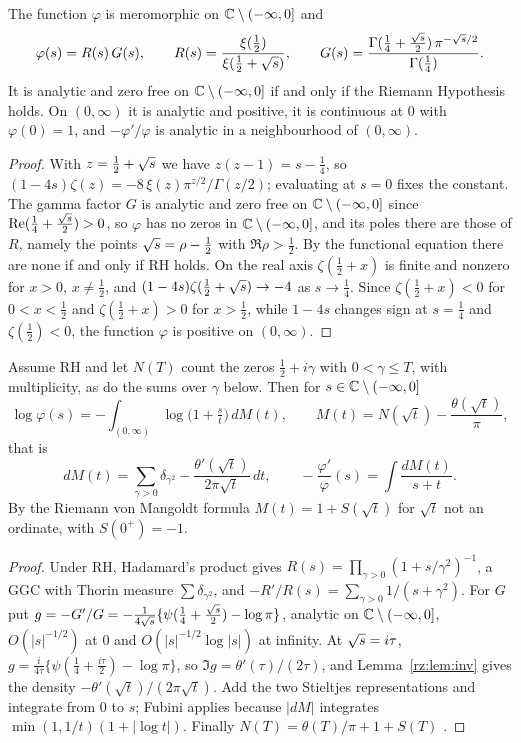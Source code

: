 \begin{proposition}\label{rz:prop:rh}
The function $\varphi$ is meromorphic on $\mathbb{C}\setminus(-\infty,0]$ and
\[
\varphi(s)=R(s)\,G(s),\qquad R(s)=\frac{\xi(\frac12)}{\xi(\frac12+\sqrt{s})},\qquad G(s)=\frac{\Gamma(\frac14+\frac{\sqrt{s}}2)\,\pi^{-\sqrt{s}/2}}{\Gamma(\frac14)} .
\]
It is analytic and zero free on $\mathbb{C}\setminus(-\infty,0]$ if and only if the Riemann Hypothesis holds. On $(0,\infty)$ it is analytic and positive, it is continuous at $0$ with $\varphi(0)=1$, and $-\varphi'/\varphi$ is analytic in a neighbourhood of $(0,\infty)$.
\end{proposition}

\begin{proof}
With $z=\frac12+\sqrt{s}$ we have $z(z-1)=s-\frac14$, so $(1-4s)\zeta(z)=-8\,\xi(z)\pi^{z/2}/\Gamma(z/2)$; evaluating at $s=0$ fixes the constant. The gamma factor $G$ is analytic and zero free on $\mathbb{C}\setminus(-\infty,0]$ since $\operatorname{Re}(\frac14+\frac{\sqrt{s}}2)>0$, so $\varphi$ has no zeros in $\mathbb{C}\setminus(-\infty,0]$, and its poles there are those of $R$, namely the points $\sqrt{s}=\rho-\frac12$ with $\Re\rho>\frac12$. By the functional equation there are none if and only if RH holds. On the real axis $\zeta(\frac12+x)$ is finite and nonzero for $x>0$, $x\ne\frac12$, and $(1-4s)\zeta(\frac12+\sqrt{s})\to-4$ as $s\to\frac14$. Since $\zeta(\frac12+x)<0$ for $0<x<\frac12$ and $\zeta(\frac12+x)>0$ for $x>\frac12$, while $1-4s$ changes sign at $s=\frac14$ and $\zeta(\frac12)<0$, the function $\varphi$ is positive on $(0,\infty)$.
\end{proof}


\begin{theorem}\label{rz:thm:thorin}
Assume RH and let $N(T)$ count the zeros $\frac12+i\gamma$ with $0<\gamma\le T$, with multiplicity, as do the sums over $\gamma$ below. Then for $s\in\mathbb{C}\setminus(-\infty,0]$
\[
\log\varphi(s)=-\int_{(0,\infty)}\log\bigl(1+\tfrac st\bigr)\,dM(t),\qquad
M(t)=N(\sqrt t)-\frac{\theta(\sqrt t)}{\pi},
\]
that is
\[
dM(t)=\sum_{\gamma>0}\delta_{\gamma^2}-\frac{\theta'(\sqrt t)}{2\pi\sqrt t}\,dt,
\qquad
-\frac{\varphi'}{\varphi}(s)=\int\frac{dM(t)}{s+t}.
\]
By the Riemann von Mangoldt formula $M(t)=1+S(\sqrt t)$ for $\sqrt t$ not an ordinate, with $S(0^+)=-1$.
\end{theorem}

\begin{proof}
Under RH, Hadamard's product gives $R(s)=\prod_{\gamma>0}(1+s/\gamma^2)^{-1}$, a GGC with Thorin measure $\sum\delta_{\gamma^2}$, and $-R'/R(s)=\sum_{\gamma>0}1/(s+\gamma^2)$. For $G$ put $g=-G'/G=-\frac{1}{4\sqrt{s}}\{\psi(\frac14+\frac{\sqrt{s}}2)-\log\pi\}$, analytic on $\mathbb{C}\setminus(-\infty,0]$, $O(|s|^{-1/2})$ at $0$ and $O(|s|^{-1/2}\log|s|)$ at infinity. At $\sqrt{s}=i\tau$, $g=\frac{i}{4\tau}\{\psi(\frac14+\frac{i\tau}2)-\log\pi\}$, so $\Im g=\theta'(\tau)/(2\tau)$, and Lemma~\ref{rz:lem:inv} gives the density $-\theta'(\sqrt t)/(2\pi\sqrt t)$. Add the two Stieltjes representations and integrate from $0$ to $s$; Fubini applies because $|dM|$ integrates $\min(1,1/t)(1+|\log t|)$. Finally $N(T)=\theta(T)/\pi+1+S(T)$ \cite[Section 9.3]{Titchmarsh}.
\end{proof}

